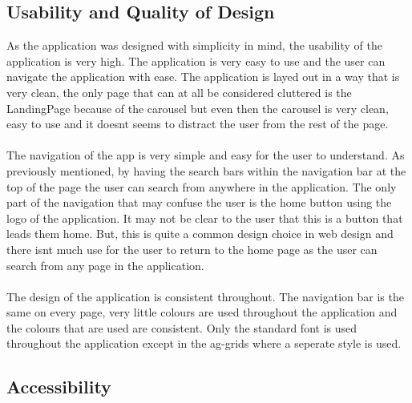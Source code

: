 \documentclass[12pt,a4paper]{article}
\begin{document}
		\subsection{Usability and Quality of Design}
			As the application was designed with simplicity in mind, the usability of the application is 
			very high. The application is very easy to use and the user can navigate the application with 
			ease. The application is layed out in a way that is very clean, the only page that can at all be 
			considered cluttered is the LandingPage because of the carousel but even then the carousel is 
			very clean, easy to use and it doesnt seems to distract the user from the rest of the page.\\
			\\
			The navigation of the app is very simple and easy for the user to understand. As previously mentioned, 
			by having the search bars within  the navigation bar at the top of the page the user can search from 
			anywhere in the application. The only part of the navigation that may confuse the user is the home button 
			using the logo of the application. It may not be clear to the user that this is a button that leads them 
			home. But, this is quite a common design choice in web design and there isnt much use for the user to return 
			to the home page as the user can search from any page in the application.\\
			\\
			The design of the application is consistent throughout. The navigation bar is the same on every page, 
			very little colours are used throughout the application and the colours that are used are consistent.
			Only the standard font is used throughout the application except in the ag-grids where a seperate style 
			is used.\\
		
		\subsection{Accessibility}

		
		
\end{document}

